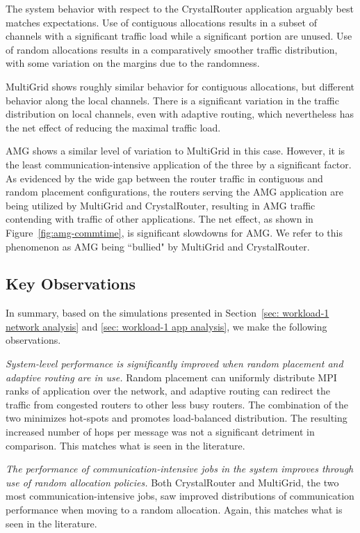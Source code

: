 The system behavior with respect to the CrystalRouter application arguably best
matches expectations. Use of contiguous allocations results in a subset of
channels with a significant traffic load while a significant portion are
unused. Use of random allocations results in a comparatively smoother traffic
distribution, with some variation on the margins due to the randomness.

MultiGrid shows roughly similar behavior for contiguous allocations, but
different behavior along the local channels. There is a significant variation in
the traffic distribution on local channels, even with adaptive routing, which
nevertheless has the net effect of reducing the maximal traffic load.

AMG shows a similar level of variation to MultiGrid in this case. However, it
is the least communication-intensive application of the three by a significant
factor. As evidenced by the wide gap between the router traffic in contiguous
and random placement configurations, the routers serving the AMG application
are being utilized by MultiGrid and CrystalRouter, resulting in AMG traffic
contending with traffic of other applications. The net effect, as shown in
Figure~\ref{fig:amg-commtime}, is significant slowdowns for AMG.
We refer to this phenomenon as AMG being ``bullied" by MultiGrid and CrystalRouter.

\subsection{Key Observations}
\label{sec:workload-1-observations}

In summary, based on the simulations presented in Section~\ref{sec: workload-1 network analysis} and \ref{sec: workload-1 app analysis}, we make the following observations.

\emph{System-level performance is significantly improved when random placement and adaptive routing are in use.} 
Random placement can uniformly distribute MPI ranks of application over the network, 
and adaptive routing can redirect the traffic from congested routers to other less busy routers. 
The combination of the two minimizes hot-spots and promotes load-balanced distribution. The resulting increased number of hops per message was not a significant detriment in comparison. This matches what is seen in the literature.

\emph{The performance of communication-intensive jobs in the system improves through use of random allocation policies.}
Both CrystalRouter and MultiGrid, the two most communication-intensive jobs,
saw improved distributions of communication performance when moving to a
random allocation. Again, this matches what is seen in the literature.

